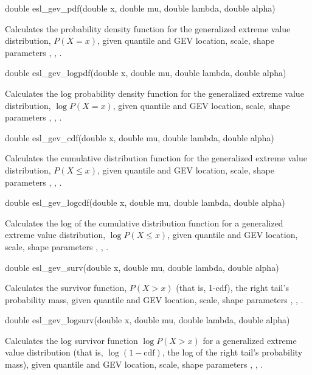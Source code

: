 \begin{sreapi}
\hypertarget{func:esl_gev_pdf()}
{\item[double esl\_gev\_pdf(double x, double mu, double lambda, double alpha)]}

Calculates the probability density function for the 
generalized extreme value distribution, $P(X=x)$, given
quantile  and GEV location, scale, shape parameters 
, , .


\hypertarget{func:esl_gev_logpdf()}
{\item[double esl\_gev\_logpdf(double x, double mu, double lambda, double alpha)]}

Calculates the log probability density function for the
generalized extreme value distribution, $\log P(X=x)$, 
given quantile  and GEV location, scale, shape
parameters , , .


\hypertarget{func:esl_gev_cdf()}
{\item[double esl\_gev\_cdf(double x, double mu, double lambda, double alpha)]}

Calculates the cumulative distribution function for the
generalized extreme value distribution, $P(X \leq x)$, 
given quantile  and GEV location, scale, shape
parameters , , .


\hypertarget{func:esl_gev_logcdf()}
{\item[double esl\_gev\_logcdf(double x, double mu, double lambda, double alpha)]}

Calculates the log of the cumulative distribution function for a
generalized extreme value distribution, $\log P(X \leq x)$, 
given quantile  and GEV location, scale, shape
parameters , , .


\hypertarget{func:esl_gev_surv()}
{\item[double esl\_gev\_surv(double x, double mu, double lambda, double alpha)]}

Calculates the survivor function, $P(X>x)$ (that is, 1-cdf),
the right tail's probability mass,  given quantile  and
GEV location, scale, shape parameters , , .


\hypertarget{func:esl_gev_logsurv()}
{\item[double esl\_gev\_logsurv(double x, double mu, double lambda, double alpha)]}

Calculates the log survivor function $\log P(X>x)$ for a 
generalized extreme value distribution (that is, 
$\log (1 - \mbox{cdf})$, the log of the right tail's probability
mass), given quantile  and GEV location, scale, shape
parameters , , .



\end{sreapi}
